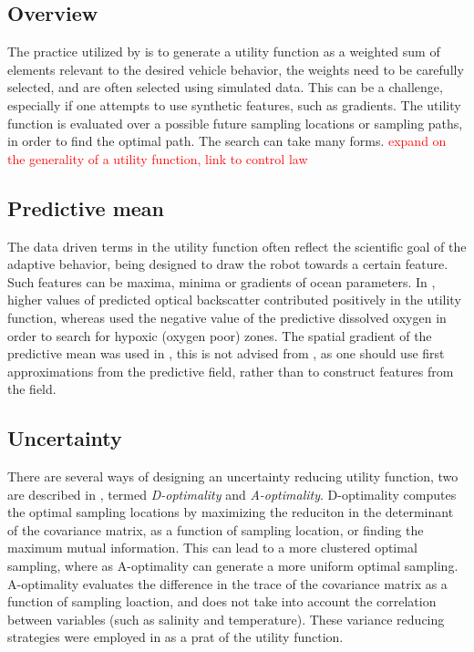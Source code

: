 \subsection{Overview}
The practice utilized by \cite{stankiewicz2021adaptive,berget2018adaptive,fossum2018information} is to generate a utility function as a weighted sum of elements relevant to the desired vehicle behavior, the weights need to be carefully selected, and are often selected using simulated data. This can be a challenge, especially if one attempts to use synthetic features, such as gradients. The utility function is evaluated over a possible future sampling locations or sampling paths, in order to find the optimal path. The search can take many forms. \textcolor{red}{expand on the generality of a utility function, link to control law}

\subsection{Predictive mean}
The data driven terms in the utility function often reflect the scientific goal of the adaptive behavior, being designed to draw the robot towards a certain feature. Such features can be maxima, minima or gradients of ocean parameters. In \cite{berget2018adaptive}, higher values of predicted optical backscatter contributed positively in the utility function, whereas \cite{stankiewicz2021adaptive} used the negative value of the predictive dissolved oxygen in order to search for hypoxic (oxygen poor) zones. The spatial gradient of the predictive mean was used in \cite{fossum2019adaptive}, this is not advised from \cite{eidsvik2015value}, as one should use first approximations from the predictive field, rather than to construct features from the field.
\subsection{Uncertainty}
There are several ways of designing an uncertainty reducing utility function, two are described in \cite{fossum2019adaptive}, termed \textit{D-optimality} and \textit{A-optimality}. D-optimality computes the optimal sampling locations by maximizing the reduciton in the determinant of the covariance matrix, as a function of sampling location, or finding the maximum mutual information. This can lead to a more clustered optimal sampling, where as A-optimality can generate a more uniform optimal sampling.  A-optimality evaluates the difference in the trace of the covariance matrix as a function of sampling loaction, and does not take into account the correlation between variables (such as salinity and temperature). These variance reducing strategies were employed in \cite{berget2018adaptive,fossum2018information,stankiewicz2021adaptive} as a prat of the utility function.

